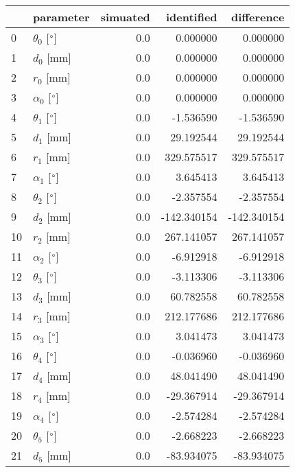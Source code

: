 \documentclass{standalone}%
\begin{document}
%
\normalsize%
\begin{tabular}{llrrr}
\toprule
{} &                 parameter & simuated &  identified &  difference \\
\midrule
0  &  $\theta_{0}$ [$\degree$] &      0.0 &    0.000000 &    0.000000 \\
1  &              $d_{0}$ [mm] &      0.0 &    0.000000 &    0.000000 \\
2  &              $r_{0}$ [mm] &      0.0 &    0.000000 &    0.000000 \\
3  &  $\alpha_{0}$ [$\degree$] &      0.0 &    0.000000 &    0.000000 \\
4  &  $\theta_{1}$ [$\degree$] &      0.0 &   -1.536590 &   -1.536590 \\
5  &              $d_{1}$ [mm] &      0.0 &   29.192544 &   29.192544 \\
6  &              $r_{1}$ [mm] &      0.0 &  329.575517 &  329.575517 \\
7  &  $\alpha_{1}$ [$\degree$] &      0.0 &    3.645413 &    3.645413 \\
8  &  $\theta_{2}$ [$\degree$] &      0.0 &   -2.357554 &   -2.357554 \\
9  &              $d_{2}$ [mm] &      0.0 & -142.340154 & -142.340154 \\
10 &              $r_{2}$ [mm] &      0.0 &  267.141057 &  267.141057 \\
11 &  $\alpha_{2}$ [$\degree$] &      0.0 &   -6.912918 &   -6.912918 \\
12 &  $\theta_{3}$ [$\degree$] &      0.0 &   -3.113306 &   -3.113306 \\
13 &              $d_{3}$ [mm] &      0.0 &   60.782558 &   60.782558 \\
14 &              $r_{3}$ [mm] &      0.0 &  212.177686 &  212.177686 \\
15 &  $\alpha_{3}$ [$\degree$] &      0.0 &    3.041473 &    3.041473 \\
16 &  $\theta_{4}$ [$\degree$] &      0.0 &   -0.036960 &   -0.036960 \\
17 &              $d_{4}$ [mm] &      0.0 &   48.041490 &   48.041490 \\
18 &              $r_{4}$ [mm] &      0.0 &  -29.367914 &  -29.367914 \\
19 &  $\alpha_{4}$ [$\degree$] &      0.0 &   -2.574284 &   -2.574284 \\
20 &  $\theta_{5}$ [$\degree$] &      0.0 &   -2.668223 &   -2.668223 \\
21 &              $d_{5}$ [mm] &      0.0 &  -83.934075 &  -83.934075 \\

\end{tabular}
\end{document}
